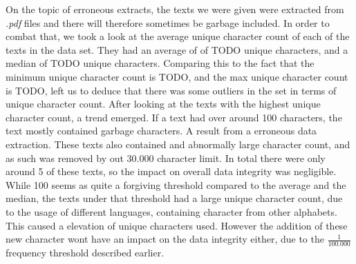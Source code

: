 On the topic of erroneous extracts, the texts we were given were extracted from
\textit{.pdf} files and there will therefore sometimes be garbage included.
In order to combat that, we took a look at the average unique character count
of each of the texts in the data set. They had an average of of TODO unique
characters, and a median of TODO unique characters. Comparing this to the
fact that the minimum unique character count is TODO, and the max unique
character count is TODO, left us to deduce that there was some outliers in the
set in terms of unique character count. After looking at the texts with the
highest unique character count, a trend emerged. If a text had over around
100 characters, the text mostly contained garbage characters. A result from
a erroneous data extraction. These texts also contained and abnormally large
character count, and as such was removed by out 30.000 character limit. In total
there were only around 5 of these texts, so the impact on overall data integrity
was negligible. While 100 seems as quite a forgiving threshold compared to
the average and the median, the texts under that threshold had a large unique
character count, due to the usage of different languages, containing character
from other alphabets. This caused a elevation of unique characters used. However
the addition of these new character wont have an impact on the data integrity
either, due to the $\frac{1}{100.000}$ frequency threshold described earlier.

